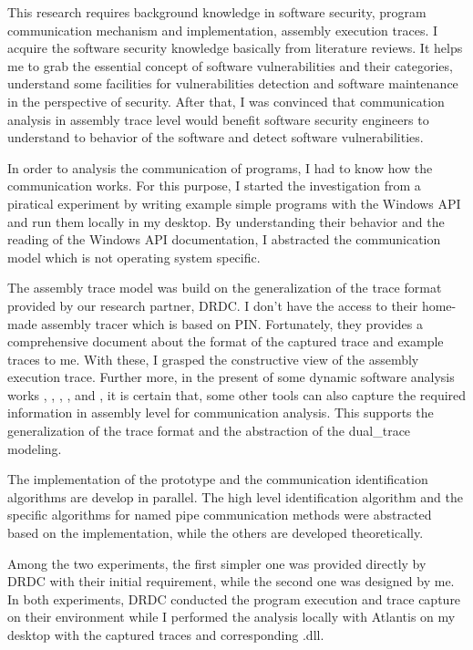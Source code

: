 This research requires background knowledge in software security, program communication mechanism and implementation, assembly execution traces. I acquire the software security knowledge basically from literature reviews. It helps me to grab the essential concept of software vulnerabilities and their categories, understand some facilities for vulnerabilities detection and software maintenance in the perspective of security. After that, I was convinced that communication analysis in assembly trace level would benefit software security engineers to understand to behavior of the software and detect software vulnerabilities. 

In order to analysis the communication of programs, I had to know how the communication works. For this purpose, I started the investigation from a piratical experiment by writing example simple programs with the Windows API and run them locally in my desktop. By understanding their behavior and the reading of the Windows API documentation, I abstracted the communication model which is not operating system specific.

The assembly trace model was build on the generalization of the trace format provided by our research partner, DRDC. I don't have the access to their home-made assembly tracer which is based on PIN\cite{_pin_????}. Fortunately, they provides a comprehensive document about the format of the captured trace and example traces to me. With these, I grasped the constructive view of the assembly execution trace. Further more, in the present of some dynamic software analysis works \cite{godefroid2008automated}, \cite{li2013software}, \cite{sailer2016coretana}, \cite{balakrishnan2004analyzing}, \cite{bhansali2006framework} and \cite{trumper2012maintenance}, it is certain that, some other tools can also capture the required information in assembly level for communication analysis. This supports the generalization of the trace format and the abstraction of the dual\_trace modeling.

The implementation of the prototype and the communication identification algorithms are develop in parallel. The high level identification algorithm and the specific algorithms for named pipe communication methods were abstracted based on the implementation, while the others are developed theoretically.

Among the two experiments, the first simpler one was provided directly by DRDC with their initial requirement, while the second one was designed by me. In both experiments, DRDC conducted the program execution and trace capture on their environment while I performed the analysis locally with Atlantis on my desktop with the captured traces and corresponding .dll.


